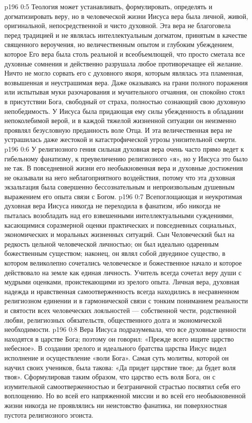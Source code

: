 \vs p196 0:5 Теология может устанавливать, формулировать, определять и догматизировать веру, но в человеческой жизни Иисуса вера была личной, живой, оригинальной, непосредственной и чисто духовной. Эта вера не благоговела перед традицией и не являлась интеллектуальным догматом, принятым в качестве священного вероучения, но величественным опытом и глубоким убеждением, которое  Его вера была столь реальной и всеобъемлющей, что просто сметала все духовные сомнения и действенно разрушала любое противоречащее ей желание. Ничто не могло сорвать его с духовного якоря, которым являлась эта пламенная, возвышенная и неустрашимая вера. Даже оказываясь на грани полного поражения или испытывая муки разочарования и мучительного отчаяния, он спокойно стоял в присутствии Бога, свободный от страха, полностью сознающий свою духовную непобедимость. У Иисуса была придающая ему силы убежденность в обладании непоколебимой верой, и в каждой тяжелой жизненной ситуации он неизменно проявлял безусловную преданность воле Отца. И эта величественная вера не устрашилась даже жестокой и катастрофической угрозы унизительной смерти.
\vs p196 0:6 У религиозного гения сильная духовная вера очень часто прямо ведет к гибельному фанатизму, к преувеличению религиозного «я», но у Иисуса это было не так. В повседневной жизни его необыкновенная вера и духовные достижения не оказывали на него неблагоприятного воздействия, потому что эта духовная экзальтация была совершенно бессознательным и непроизвольным душевным выражением его опыта связи с Богом.
\vs p196 0:7 Всепоглощающая и неукротимая духовная вера Иисуса никогда не переходила в фанатизм, ибо никогда не пыталась возобладать над его взвешенными интеллектуальными суждениями, касающимися соразмерной оценки практических и повседневных социальных, экономических и моральных жизненных ситуаций. Сын Человеческий был на редкость цельной человеческой личностью; он был идеально одаренным божественным существом; наконец, он являл собой двуединое существо, в котором великолепно сочетались человеческое и божественное начало и которое действовало на земле как единая личность. Учитель всегда сочетал веру души с мудрыми оценками, проистекающими из зрелого опыта. Личная вера, духовная надежда и нравственная самоотверженность всегда находились в несравненном религиозном единении и в гармонической связи с тонким пониманием реальности и святости всех человеческих лояльностей --- собственной чести, родственной любви, религиозных обязательств, общественного долга и экономической необходимости.
\vs p196 0:8 Вера Иисуса подразумевала, что все духовные ценности находятся в царстве Бога; поэтому он говорил: «Прежде всего ищите царство небесное». В создании зрелого и идеального братства царства Иисус видел исполнение и осуществление «воли Бога». Самая суть молитвы, которой он научил своих учеников, была такова: «Да придет царствие твое; да будет воля твоя». Сформулировав таким образом, что царство есть воля Бога, он с изумительной самоотверженностью и безграничной страстью посвятил себя его воплощению. Но во всей его напряженной миссии и во всей его необыкновенной жизни никогда не проявлялись ни неистовство фанатика, ни поверхностная пустота религиозного эгоиста.
